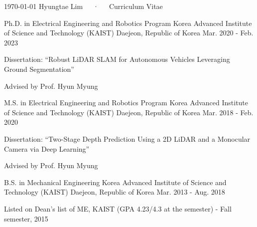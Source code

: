 \documentclass[11pt, a4paper]{../awesome-cv}
\begin{document}
\makecvheader

\makecvfooter
  {\today}
  {Hyungtae Lim~~~·~~~Curriculum Vitae}
  {\thepage}



\begin{cventries}
\cventry
  {Ph.D. in Electrical Engineering and Robotics Program} {Korea Advanced Institute of Science and Technology (KAIST)} {Daejeon, Republic of Korea} {Mar. 2020 - Feb. 2023} {
    \begin{cvitems} \item {Dissertation: ``Robust LiDAR SLAM for Autonomous Vehicles Leveraging Ground Segmentation''}
      \item {Advised by Prof. Hyun Myung}
    \end{cvitems}
  }

  \cventry
  {M.S. in Electrical Engineering and Robotics Program} {Korea Advanced Institute of Science and Technology (KAIST)} {Daejeon, Republic of Korea} {Mar. 2018 - Feb. 2020} {
    \begin{cvitems} \item {Dissertation: ``Two-Stage Depth Prediction Using a 2D LiDAR and a Monocular Camera via Deep Learning''}
      \item {Advised by Prof. Hyun Myung}
    \end{cvitems}
  }

  \cventry
  {B.S. in Mechanical Engineering} {Korea Advanced Institute of Science and Technology (KAIST)} {Daejeon, Republic of Korea} {Mar. 2013 - Aug. 2018} {
    \begin{cvitems} \item {Listed on Dean’s list of ME, KAIST (GPA 4.23/4.3 at the semester) - Fall semester, 2015}
    \end{cvitems}
  }

\end{cventries}
\end{document}
